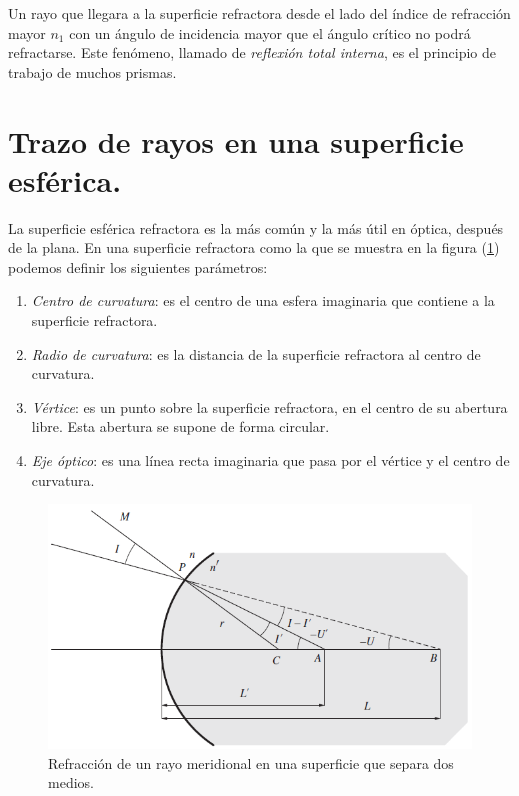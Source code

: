 \documentclass[14pt]{extarticle}
\begin{document}
Un rayo que llegara a la superficie refractora desde el lado del índice de refracción mayor $n_{1}$ con un ángulo de incidencia mayor que el ángulo crítico no podrá refractarse. Este fenómeno, llamado de \textit{reflexión total interna}, es el principio de trabajo de muchos prismas.

\section{Trazo de rayos en una superficie esférica.}

La superficie esférica refractora es la más común y la más útil en óptica, después de la plana. En una superficie refractora como la que se muestra en la figura (\ref{fig:figura_10}) podemos definir los siguientes parámetros:
\begin{enumerate}[label=\alph*)]
\item \textit{Centro de curvatura}: es el centro de una esfera imaginaria que contiene a la superficie refractora.
\item \textit{Radio de curvatura}: es la distancia de la superficie refractora al centro de curvatura.
\item \textit{Vértice}: es un punto sobre la superficie refractora, en el centro de su abertura libre. Esta abertura se supone de forma circular.
\item \textit{Eje óptico}: es una línea recta imaginaria que pasa por el vértice y el centro de curvatura.
\end{enumerate}
\begin{figure}[H]
    \centering
    \includegraphics[scale=0.75]{Imagenes/Optica_Geometrica_06.png}
    \caption{Refracción de un rayo meridional en una superficie que separa dos medios.}
    \label{fig:figura_10}
\end{figure}
\end{document}

